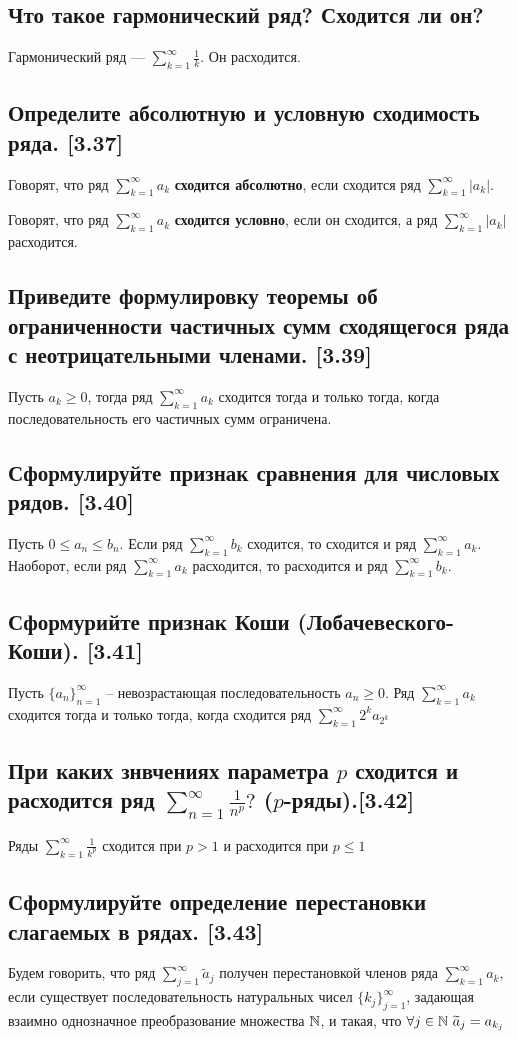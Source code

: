 \documentclass[12pt, a4paper]{article}
\begin{document}
    \subsection{Что такое гармонический ряд? Сходится ли он?}
    Гармонический ряд --- $\sum_{k=1}^{\infty} \frac{1}{k}$. Он расходится.
    \subsection{Определите абсолютную и условную сходимость ряда. [3.37]}
    Говорят, что ряд $\sum_{k=1}^{\infty} a_k$ \textbf{сходится абсолютно}, если сходится ряд $\sum_{k=1}^{\infty} |a_k|$.

    Говорят, что ряд $\sum_{k=1}^{\infty} a_k$ \textbf{сходится условно}, если он сходится, а ряд $\sum_{k=1}^{\infty} |a_k|$ расходится.
    \subsection{Приведите формулировку теоремы об ограниченности частичных сумм сходящегося ряда с неотрицательными членами. [3.39]}
    Пусть $a_k \geq 0$, тогда ряд $\sum_{k=1}^{\infty} a_k$ сходится тогда и только тогда, когда последовательность его частичных сумм ограничена.
    \subsection{Сформулируйте признак сравнения для числовых рядов. [3.40]}
    Пусть $0 \leq a_n \leq b_n$. Если ряд $\sum_{k=1}^{\infty} b_k$ сходится, то сходится и ряд $\sum_{k=1}^{\infty} a_k$. Наоборот, если ряд $\sum_{k=1}^{\infty} a_k$ расходится, то расходится и ряд $\sum_{k=1}^{\infty} b_k$. 
    \subsection{Сформурийте признак Коши (Лобачевеского-Коши). [3.41]}
    Пусть $\{a_n\}^{\infty}_{n=1}$ -- невозрастающая последовательность $a_n \geq 0$. Ряд $\sum_{k=1}^{\infty} a_k$ сходится тогда и только тогда, когда сходится ряд $\sum_{k=1}^{\infty} 2^k a_{2^k}$
    \subsection{При каких знвчениях параметра $p$ сходится и расходится ряд $\sum_{n=1}^{\infty} \frac{1}{n^p}?$ ($p$-ряды).[3.42]}
    Ряды $\sum_{k=1}^{\infty} \frac{1}{k^p}$ сходится при $p > 1$ и расходится при $p \leq 1$
    \subsection{Сформулируйте определение перестановки слагаемых в рядах. [3.43]}
    Будем говорить, что ряд $\sum_{j=1}^{\infty} \widetilde{a}_{j}$ получен перестановкой членов ряда $\sum_{k=1}^{\infty} a_k$, если существует последовательность натуральных чисел $\{k_j\}^{\infty}_{j=1}$, задающая взаимно однозначное преобразование множества $\mathbb{N}$, и такая, что $\forall j \in \mathbb{N} \ \widetilde{a}_j = a_{k_j}$
\end{document}
